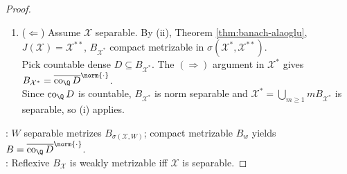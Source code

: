 \begin{corollary}
\begin{proof}
\begin{enumerate}[label=(\roman*)]
Since $D\subseteq K$ and $x\in\overline D^w$, weak continuity gives $\operatorname{Re}\varphi(x)\leq\sup_{y\in K}\operatorname{Re}\varphi(y)$, contradiction.\\
Thus $B=K=\overline{\operatorname{co}_{\Q}D}^{\norm{\cdot}}$; $\operatorname{co}_{\Q}D$ is countable, so $B$ is norm separable, and $\mathcal X=\bigcup_{m\geq1}mB$ is separable.
\item[$(iii)$] ($\Leftarrow$) Assume $\mathcal X$ separable. By (ii), Theorem \ref{thm:banach-alaoglu}, $J(\mathcal X)=\mathcal X^{**}$, $B_{\mathcal X^*}$ compact metrizable in $\sigma(\mathcal X^*,\mathcal X^{**})$.\\
Pick countable dense $D\subseteq B_{\mathcal X^*}$. The $(\Rightarrow)$ argument in $\mathcal X^*$ gives $B_{\mathcal X^*}=\overline{\operatorname{co}_{\Q}D}^{\norm{\cdot}}$.\\
Since $\operatorname{co}_{\Q}D$ is countable, $B_{\mathcal X^*}$ is norm separable and $\mathcal X^*=\bigcup_{m\geq1}mB_{\mathcal X^*}$ is separable, so (i) applies.
\end{enumerate}
: $W$ separable metrizes $B_{\sigma(\mathcal X,W)}$; compact metrizable $B_w$ yields $B=\overline{\operatorname{co}_{\Q}D}^{\norm{\cdot}}$.\\
: Reflexive $B_{\mathcal X}$ is weakly metrizable iff $\mathcal X$ is separable.
\end{proof}
\end{corollary}

